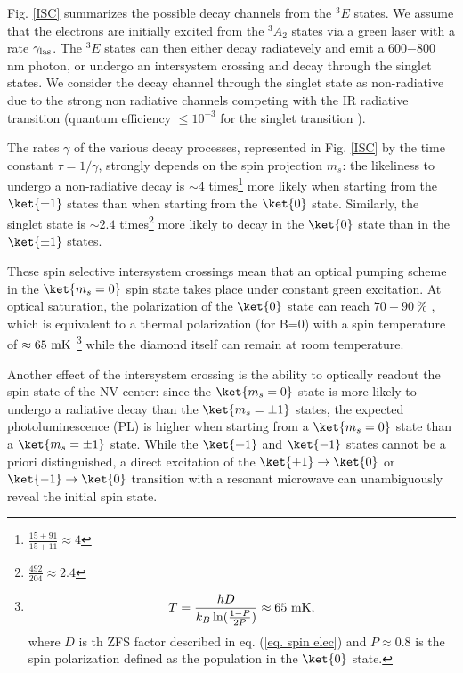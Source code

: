 \documentclass[a4paper,11pt]{report}
\begin{document}
Fig. \ref{ISC} summarizes the possible decay channels from the $^3E$ states. We assume that the electrons are initially excited from the $^3A_2$ states via a green laser with a rate $\gamma_{\rm las}$. The $^3E$ states can then either decay radiatevely and emit a 600$-$800 nm photon, or undergo an intersystem crossing and decay through the singlet states. We consider the decay channel through the singlet state as non-radiative due to the strong non radiative channels competing with the IR radiative transition (quantum efficiency $\leq 10^{-3}$ for the singlet transition \citep{rogers2008infrared, ma2010excited, acosta2010optical}).

The rates $\gamma$ of the various decay processes, represented in Fig. \ref{ISC} by the time constant $\tau=1/\gamma$, strongly depends on the spin projection $m_s$: the likeliness to undergo a non-radiative decay is $\sim 4$ times\footnote{$\frac{15+91}{15+11}\approx 4$} more likely when starting from the $\ket{\pm 1}$ states than when starting from the $\ket{0}$ state. Similarly, the singlet state is $\sim 2.4$ times\footnote{$\frac{492}{204} \approx 2.4$} more likely to decay in the $\ket{0}$ state than in the $\ket{\pm 1}$ states.

These spin selective intersystem crossings mean that an optical pumping scheme in the $\ket{m_s=0}$ spin state takes place under constant green excitation. At optical saturation, the polarization of the $\ket{0}$ state can reach $70-90\ \%$ \citep{gupta2016efficient}, which is equivalent to a thermal polarization (for B=0) with a spin temperature of $\approx 65\ \rm mK$ \footnote{\begin{equation*}
T=\frac{h D}{k_B \ln (\frac{1-P}{2P})} \approx 65\ \rm mK,
\end{equation*}
where $D$ is th ZFS factor described in eq. (\ref{eq. spin elec}) and $P\approx 0.8$ is the spin polarization defined as the population in the $\ket{0}$ state.} while the diamond itself can remain at room temperature.

Another effect of the intersystem crossing is the ability to optically readout the spin state of the NV center: since the $\ket{m_s=0}$ state is more likely to undergo a radiative decay than the $\ket{m_s=\pm 1}$ states, the expected photoluminescence (PL) is higher when starting from a $\ket{m_s=0}$ state than a $\ket{m_s=\pm 1}$ state. While the $\ket{+1}$ and $\ket{-1}$ states cannot be a priori distinguished, a direct excitation of the $\ket{+1} \to \ket{0}$ or $\ket{-1} \to \ket{0}$ transition with a resonant microwave can unambiguously reveal the initial spin state.
\end{document}
